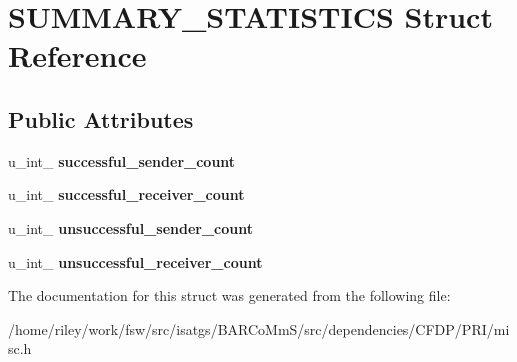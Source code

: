 \hypertarget{struct_s_u_m_m_a_r_y___s_t_a_t_i_s_t_i_c_s}{}\section{S\+U\+M\+M\+A\+R\+Y\+\_\+\+S\+T\+A\+T\+I\+S\+T\+I\+CS Struct Reference}
\label{struct_s_u_m_m_a_r_y___s_t_a_t_i_s_t_i_c_s}
\subsection*{Public Attributes}
\begin{DoxyCompactItemize}
\item 
u\+\_\+int\+\_ {\bfseries successful\+\_\+sender\+\_\+count}\hypertarget{struct_s_u_m_m_a_r_y___s_t_a_t_i_s_t_i_c_s_a34a65becf71548f1b959f9d6b818d033}{}\label{struct_s_u_m_m_a_r_y___s_t_a_t_i_s_t_i_c_s_a34a65becf71548f1b959f9d6b818d033}

\item 
u\+\_\+int\+\_ {\bfseries successful\+\_\+receiver\+\_\+count}\hypertarget{struct_s_u_m_m_a_r_y___s_t_a_t_i_s_t_i_c_s_a0d3c2eb46cf2b2bb42360a801d83eee3}{}\label{struct_s_u_m_m_a_r_y___s_t_a_t_i_s_t_i_c_s_a0d3c2eb46cf2b2bb42360a801d83eee3}

\item 
u\+\_\+int\+\_ {\bfseries unsuccessful\+\_\+sender\+\_\+count}\hypertarget{struct_s_u_m_m_a_r_y___s_t_a_t_i_s_t_i_c_s_a2fbce6bbbb0fb40009b6d8d33249b2eb}{}\label{struct_s_u_m_m_a_r_y___s_t_a_t_i_s_t_i_c_s_a2fbce6bbbb0fb40009b6d8d33249b2eb}

\item 
u\+\_\+int\+\_ {\bfseries unsuccessful\+\_\+receiver\+\_\+count}\hypertarget{struct_s_u_m_m_a_r_y___s_t_a_t_i_s_t_i_c_s_a3de043e0fb89fe1b6e7a4cbbfa041367}{}\label{struct_s_u_m_m_a_r_y___s_t_a_t_i_s_t_i_c_s_a3de043e0fb89fe1b6e7a4cbbfa041367}

\end{DoxyCompactItemize}


The documentation for this struct was generated from the following file\+:\begin{DoxyCompactItemize}
\item 
/home/riley/work/fsw/src/isatgs/\+B\+A\+R\+Co\+Mm\+S/src/dependencies/\+C\+F\+D\+P/\+P\+R\+I/misc.\+h\end{DoxyCompactItemize}
